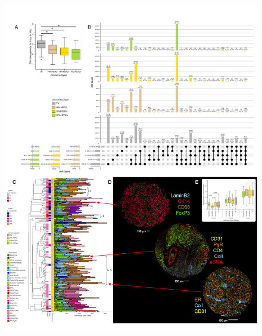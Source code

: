 \documentclass[preprint,review,3p,12pt]{elsarticle}
\begin{document}
\begin{figure}[p]
\centering\includegraphics[width=\linewidth,
                 keepaspectratio]{fig2_condensed}
\caption{}
\label{fig:fig2}
\end{figure}

\newpage
\end{document}
